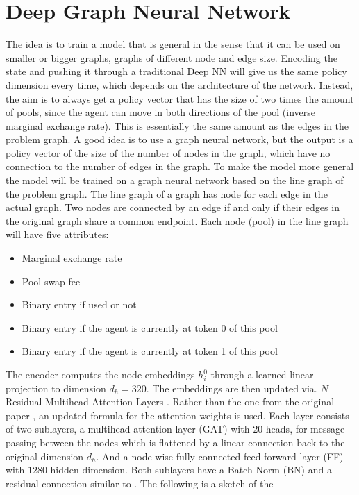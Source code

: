 \section{Deep Graph Neural Network}
The idea is to train a model that is general in the sense that it can be used
on smaller or bigger graphs, graphs of different node and edge size. Encoding
the state and pushing it through a traditional Deep NN will give us the same
policy dimension every time, which depends on the architecture of the
network. Instead, the aim is to always get a policy vector that has the size
of two times the amount of pools, since the agent can move in both directions
of the pool (inverse marginal exchange rate). This is essentially the same
amount as the edges in the problem graph. A good idea is to use a graph
neural network, but the output is a policy vector of the size of the number of
nodes in the graph, which have no connection to the number of edges in the
graph. To make the model more general the model will be trained on a graph
neural network based on the line graph of the problem graph. The line graph of a
graph has node for each edge in the actual graph. Two nodes are connected
by an edge if and only if their edges in the original graph share a common
endpoint. Each node (pool) in the line graph will have five attributes:
\begin{itemize}
    \item Marginal exchange rate
    \item Pool swap fee
    \item Binary entry if used or not
    \item Binary entry if the agent is currently at token 0 of this pool
    \item Binary entry if the agent is currently at token 1 of this pool
\end{itemize}
The encoder computes the node embeddings $h_i^{0}$ through a learned linear
projection to dimension $d_h = 320$. The embeddings are then updated via. $N$
Residual Multihead Attention Layers \cite{gatv2}. Rather than the one from
the original paper \cite{gan_velickovic}, an updated formula for the
attention weights is used. Each layer consists of two sublayers, a multihead
attention layer (GAT) with $20$ heads, for message passing between the nodes
which is flattened by a linear connection back to the original dimension
$d_h$. And a node-wise fully connected feed-forward layer (FF) with $1280$
hidden dimension. Both sublayers have a Batch Norm (BN) and a residual
connection similar to \cite{rl_coopt}. The following is a sketch of the
